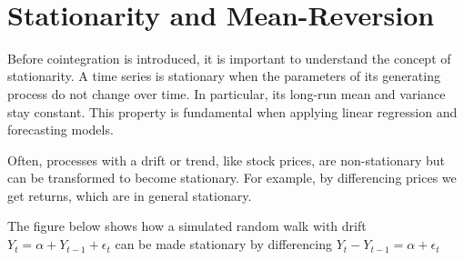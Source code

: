 \documentclass{article}
\begin{document}
    \begin{center}
    \end{center}
    { \hspace*{\fill} \\}
    
    \section{Stationarity and
Mean-Reversion}\label{stationarity-and-mean-reversion}

    Before cointegration is introduced, it is important to understand the
concept of stationarity. A time series is stationary when the parameters
of its generating process do not change over time. In particular, its
long-run mean and variance stay constant. This property is fundamental
when applying linear regression and forecasting models.

Often, processes with a drift or trend, like stock prices, are
non-stationary but can be transformed to become stationary. For example,
by differencing prices we get returns, which are in general stationary.

The figure below shows how a simulated random walk with drift
\(Y_t = \alpha + Y_{t-1} + \epsilon_t\) can be made stationary by
differencing \(Y_t - Y_{t-1} = \alpha + \epsilon_t\)
\end{document}

